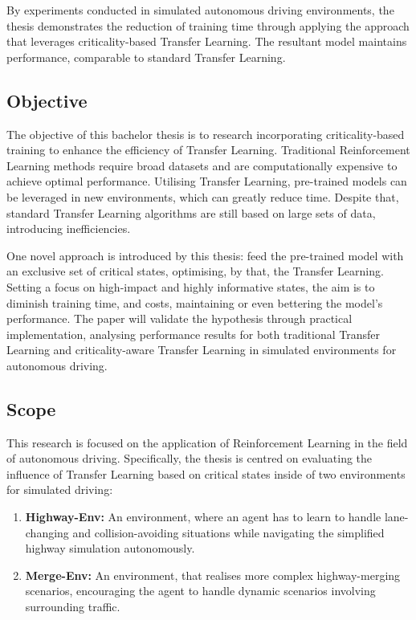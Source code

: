 By experiments conducted in simulated autonomous driving environments, the thesis demonstrates the reduction of training time through applying the approach that leverages criticality-based Transfer Learning. The resultant model maintains performance, comparable to standard Transfer Learning.

\subsection{Objective}

The objective of this bachelor thesis is to research incorporating criticality-based training to enhance the efficiency of Transfer Learning. Traditional Reinforcement Learning methods require broad datasets and are computationally expensive to achieve optimal performance. Utilising Transfer Learning, pre-trained models can be leveraged in new environments, which can greatly reduce time. Despite that, standard Transfer Learning algorithms are still based on large sets of data, introducing inefficiencies.

One novel approach is introduced by this thesis: feed the pre-trained model with an exclusive set of critical states, optimising, by that, the Transfer Learning. Setting a focus on high-impact and highly informative states, the aim is to diminish training time, and costs, maintaining or even bettering the model's performance. The paper will validate the hypothesis through practical implementation, analysing performance results for both traditional Transfer Learning and criticality-aware Transfer Learning in simulated environments for autonomous driving.

\subsection{Scope}

This research is focused on the application of Reinforcement Learning in the field of autonomous driving. Specifically, the thesis is centred on evaluating the influence of Transfer Learning based on critical states inside of two environments for simulated driving:

\begin{enumerate}
 \item \textbf{Highway-Env:} An environment, where an agent has to learn to handle lane-changing and collision-avoiding situations while navigating the simplified highway simulation autonomously.
 \item \textbf{Merge-Env:} An environment, that realises more complex highway-merging scenarios, encouraging the agent to handle dynamic scenarios involving surrounding traffic.
\end{enumerate}


